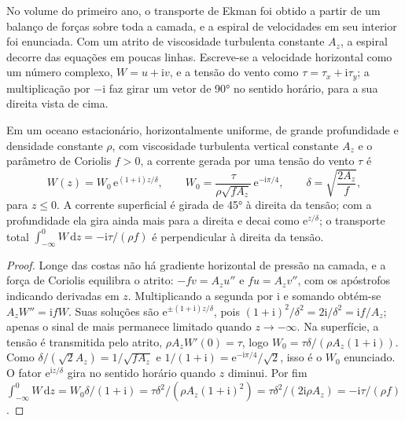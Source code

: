 No volume do primeiro ano, o transporte de Ekman foi obtido a partir de um balanço de forças
sobre toda a camada, e a espiral de velocidades em seu interior foi enunciada. Com
um atrito de viscosidade turbulenta constante $A_z$, a espiral decorre
das equações em poucas linhas. Escreve-se a velocidade horizontal como um
número complexo, $W = u + \mathrm iv$, e a tensão do vento como $\tau =
\tau_x + \mathrm i\tau_y$; a multiplicação por $-\mathrm i$ faz girar um vetor
de \ang{90} no sentido horário, para a sua direita vista de cima.

\begin{theorem}\label{thm:b3:ocean-dynamics:ekman}
Em um oceano estacionário, horizontalmente uniforme, de grande profundidade e densidade constante
$\rho$, com viscosidade turbulenta vertical constante $A_z$ e o
parâmetro de Coriolis $f > 0$, a corrente gerada por uma tensão do vento $\tau$ é
\[
W(z) = W_0\,\mathrm e^{(1+\mathrm i)z/\delta},\qquad
W_0 = \frac{\tau}{\rho\sqrt{fA_z}}\,\mathrm e^{-\mathrm i\pi/4},\qquad
\delta = \sqrt{\frac{2A_z}{f}} ,
\]
para $z \le 0$. A corrente superficial é girada de \ang{45} à direita da
tensão; com a profundidade ela gira ainda mais para a direita e decai como $\mathrm
e^{z/\delta}$; o transporte total $\int_{-\infty}^0 W\,\mathrm dz =
-\mathrm i\tau/(\rho f)$ é perpendicular à direita da tensão.
\end{theorem}

\begin{proof}
Longe das costas não há gradiente horizontal de pressão na camada,
e a força de Coriolis equilibra o atrito: $-fv = A_z u''$ e $fu =
A_z v''$, com os apóstrofos indicando derivadas em $z$. Multiplicando a segunda por
$\mathrm i$ e somando obtém-se $A_zW'' = \mathrm ifW$. Suas soluções são
$\mathrm e^{\pm(1+\mathrm i)z/\delta}$, pois $(1+\mathrm i)^2/\delta^2 =
2\mathrm i/\delta^2 = \mathrm if/A_z$; apenas o sinal de mais permanece limitado quando
$z \to -\infty$. Na superfície, a tensão é transmitida pelo atrito,
$\rho A_zW'(0) = \tau$, logo $W_0 = \tau\delta/(\rho A_z(1+\mathrm i))$.
Como $\delta/(\sqrt2 A_z) = 1/\sqrt{fA_z}$ e $1/(1+\mathrm i) = \mathrm
e^{-\mathrm i\pi/4}/\sqrt2$, isso é o $W_0$ enunciado. O fator
$\mathrm e^{\mathrm iz/\delta}$ gira no sentido horário quando $z$ diminui. Por fim
$\int_{-\infty}^0 W\,\mathrm dz = W_0\delta/(1+\mathrm i) =
\tau\delta^2/(\rho A_z(1+\mathrm i)^2) = \tau\delta^2/(2\mathrm i\rho A_z)
= -\mathrm i\tau/(\rho f)$.
\end{proof}

